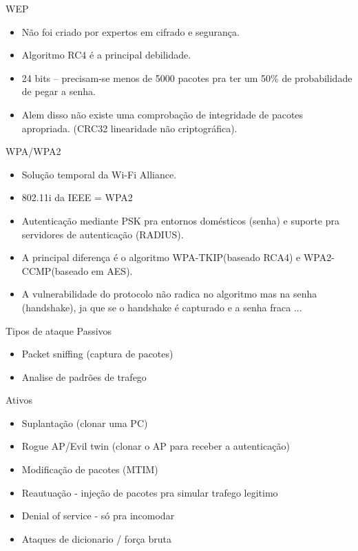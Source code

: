 \documentclass[xcolor=x11names,compress]{beamer}
\renewcommand{\(}{\begin{columns}}
\renewcommand{\)}{\end{columns}}
\newcommand{\<}[1]{\begin{column}{#1}}
\renewcommand{\>}{\end{column}}
\begin{document}
\begin{frame}{WEP}
\begin{itemize}
\item Não foi criado por expertos em cifrado e segurança.
\item Algoritmo RC4 é a principal debilidade.
\item 24 bits – precisam-se menos de 5000 pacotes pra ter um 50\% de probabilidade de pegar a senha.
\item Alem disso não existe uma comprobação de integridade de pacotes apropriada. (CRC32 linearidade não criptográfica).
\end{itemize}
\end{frame}

\begin{frame}{WPA/WPA2}
\begin{itemize}
\item Solução temporal da Wi-Fi Alliance.
\item 802.11i da IEEE  = WPA2
\item Autenticação mediante PSK pra entornos domésticos (senha) e suporte pra servidores de autenticação (RADIUS).
\item A principal diferença é o algoritmo WPA-TKIP(baseado RCA4) e WPA2-CCMP(baseado em AES).
\item A vulnerabilidade do protocolo não radica no algoritmo mas na senha (handshake), ja que se o handshake é capturado e a senha fraca ...
\end{itemize}
\end{frame}

\begin{frame}{Tipos de ataque}
Passivos
\begin{itemize}
\item Packet sniffing (captura de pacotes)
\item Analise de padrões de trafego
\end{itemize}
\pause
Ativos
\begin{itemize}
\item Suplantação (clonar uma PC)
\item Rogue AP/Evil twin (clonar o AP para receber a autenticação)
\item Modificação de pacotes (MTIM)
\item Reautuação - injeção de pacotes pra simular trafego legitimo
\item Denial of service - só pra incomodar
\item Ataques de dicionario / força bruta
\end{itemize}
\end{frame}
\end{document}
